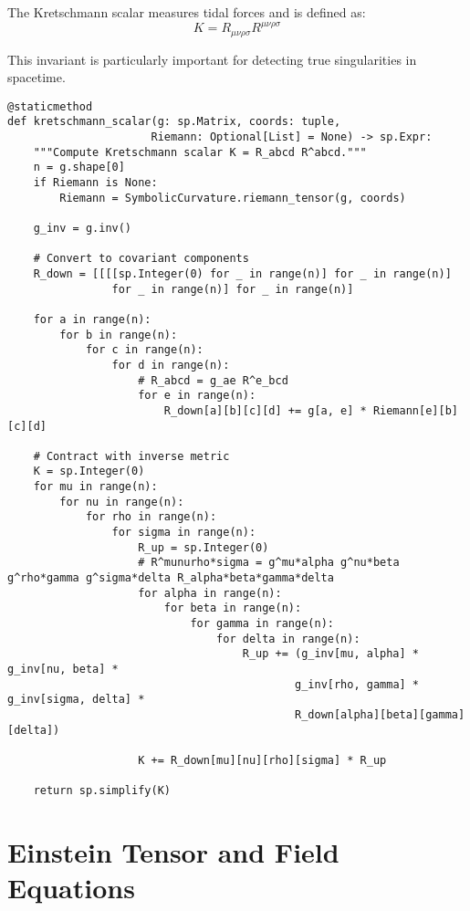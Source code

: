 \documentclass[11pt,a4paper]{article}
\theoremstyle{definition}
\theoremstyle{remark}
\newcommand{\Kret}{K}
\begin{document}
The Kretschmann scalar measures tidal forces and is defined as:
\begin{equation}
\Kret = R_{\mu\nu\rho\sigma} R^{\mu\nu\rho\sigma}
\end{equation}

This invariant is particularly important for detecting true singularities in spacetime.

\begin{lstlisting}
@staticmethod
def kretschmann_scalar(g: sp.Matrix, coords: tuple, 
                      Riemann: Optional[List] = None) -> sp.Expr:
    """Compute Kretschmann scalar K = R_abcd R^abcd."""
    n = g.shape[0]
    if Riemann is None:
        Riemann = SymbolicCurvature.riemann_tensor(g, coords)
    
    g_inv = g.inv()
    
    # Convert to covariant components
    R_down = [[[[sp.Integer(0) for _ in range(n)] for _ in range(n)] 
                for _ in range(n)] for _ in range(n)]
    
    for a in range(n):
        for b in range(n):
            for c in range(n):
                for d in range(n):
                    # R_abcd = g_ae R^e_bcd
                    for e in range(n):
                        R_down[a][b][c][d] += g[a, e] * Riemann[e][b][c][d]
    
    # Contract with inverse metric
    K = sp.Integer(0)
    for mu in range(n):
        for nu in range(n):
            for rho in range(n):
                for sigma in range(n):
                    R_up = sp.Integer(0)
                    # R^munurho*sigma = g^mu*alpha g^nu*beta g^rho*gamma g^sigma*delta R_alpha*beta*gamma*delta
                    for alpha in range(n):
                        for beta in range(n):
                            for gamma in range(n):
                                for delta in range(n):
                                    R_up += (g_inv[mu, alpha] * g_inv[nu, beta] * 
                                            g_inv[rho, gamma] * g_inv[sigma, delta] * 
                                            R_down[alpha][beta][gamma][delta])
                    
                    K += R_down[mu][nu][rho][sigma] * R_up
    
    return sp.simplify(K)
\end{lstlisting}

\section{Einstein Tensor and Field Equations}
\end{document}
